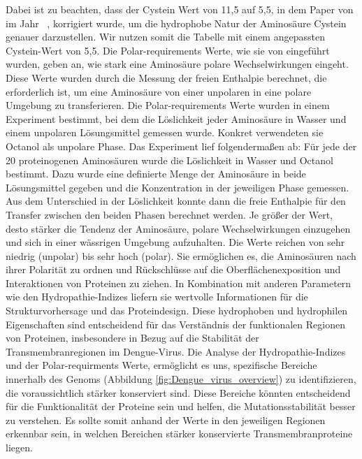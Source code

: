 \documentclass[german,version-2022-01]{uzl-thesis}
\begin{document}
Dabei ist zu beachten, dass der Cystein Wert von 11,5 auf 5,5, in dem Paper  von \citeauthor{woese_evolution_1973} im Jahr \citeyear{woese_evolution_1973}~\cite{woese_evolution_1973}, korrigiert wurde, um die hydrophobe Natur der Aminos\"aure Cystein genauer darzustellen. Wir nutzen somit die Tabelle mit einem angepassten Cystein-Wert von 5,5. 
Die Polar-requirements Werte, wie sie von \citeauthor{woese_fundamental_1966} eingef\"uhrt wurden, geben an, wie stark eine Aminos\"aure polare Wechselwirkungen eingeht. Diese Werte wurden durch die Messung der freien Enthalpie berechnet, die erforderlich ist, um eine Aminos\"aure von einer unpolaren in eine polare Umgebung zu transferieren. Die Polar-requirements Werte wurden in einem Experiment bestimmt, bei dem die L\"oslichkeit jeder Aminos\"aure in Wasser und einem unpolaren L\"osungsmittel gemessen wurde. Konkret verwendeten sie Octanol als unpolare Phase. Das Experiment lief folgenderma\ss{}en ab: F\"ur jede der 20 proteinogenen Aminos\"auren wurde die L\"oslichkeit in Wasser und Octanol bestimmt. Dazu wurde eine definierte Menge der Aminos\"aure in beide L\"osungsmittel gegeben und die Konzentration in der jeweiligen Phase gemessen. Aus dem Unterschied in der L\"oslichkeit konnte dann die freie Enthalpie f\"ur den Transfer zwischen den beiden Phasen berechnet werden. Je gr\"o\ss{}er der Wert, desto st\"arker die Tendenz der Aminos\"aure, polare Wechselwirkungen einzugehen und sich in einer w\"assrigen Umgebung aufzuhalten. Die Werte reichen von sehr niedrig (unpolar) bis sehr hoch (polar). Sie erm\"oglichen es, die Aminos\"auren nach ihrer Polarit\"at zu ordnen und R\"uckschl\"usse auf die Oberfl\"achenexposition und Interaktionen von Proteinen zu ziehen. In Kombination mit anderen Parametern wie den Hydropathie-Indizes liefern sie wertvolle Informationen f\"ur die Strukturvorhersage und das Proteindesign. Diese hydrophoben und hydrophilen Eigenschaften sind entscheidend f\"ur das Verst\"andnis der funktionalen Regionen von Proteinen, insbesondere in Bezug auf die Stabilit\"at der Transmembranregionen im Dengue-Virus. Die Analyse der Hydropathie-Indizes und der Polar-requirments Werte, erm\"oglicht es uns, spezifische Bereiche innerhalb des Genoms (Abbildung \ref{fig:Dengue_virus_overview}) zu identifizieren, die voraussichtlich st\"arker konserviert sind. Diese Bereiche k\"onnten entscheidend f\"ur die Funktionalit\"at der Proteine sein und helfen, die Mutationsstabilit\"at besser zu verstehen. Es sollte somit anhand der Werte in den jeweiligen Regionen erkennbar sein, in welchen Bereichen st\"arker konservierte Transmembranproteine liegen.
\end{document}
